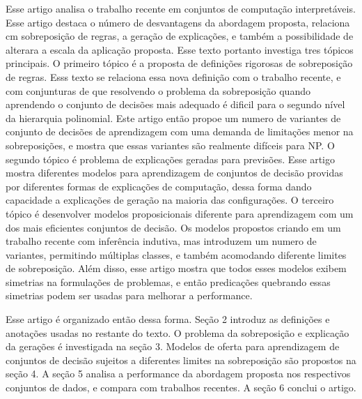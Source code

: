 \documentclass[a4paper, 12 pt]{article}
\begin{document}
	Esse artigo analisa o trabalho recente em conjuntos de computação interpretáveis. Esse artigo destaca o número de desvantagens da abordagem proposta, relaciona cm sobreposição de regras, a geração de explicações, e também a possibilidade de alterara a escala da aplicação proposta. Esse texto portanto investiga tres tópicos principais. O primeiro tópico é a proposta de definições rigorosas de sobreposição de regras. Esss texto se relaciona essa nova definição com o trabalho recente, e com conjunturas de que resolvendo o problema da sobreposição quando aprendendo o conjunto de decisões mais adequado é dificil para o segundo nível da hierarquia polinomial. Este artigo então propoe um numero de variantes de conjunto de decisões de aprendizagem com uma demanda de limitações menor na sobreposições, e mostra que essas variantes são realmente difíceis para NP. O segundo tópico é problema de explicações geradas para previsões. Esse artigo mostra diferentes modelos para aprendizagem de conjuntos de decisão providas por diferentes formas de explicações de computação, dessa forma dando capacidade a explicações de geração na maioria das configurações. O terceiro tópico é desenvolver modelos proposicionais diferente para aprendizagem com um dos mais eficientes conjuntos de decisão. Os modelos propostos criando em um trabalho recente com inferência indutiva, mas introduzem um numero de variantes, permitindo múltiplas classes, e também acomodando diferente limites de sobreposição. Além disso, esse artigo mostra que todos esses modelos exibem simetrias na formulações de problemas, e então predicações quebrando essas simetrias podem ser usadas para melhorar a performance.
	
	Esse artigo é organizado então dessa forma. Seção 2 introduz as definições e anotações usadas no restante do texto. O problema da sobreposição e explicação da gerações é investigada na seção 3. Modelos de oferta para aprendizagem de conjuntos de decisão sujeitos a diferentes limites na sobreposição são propostos na seção 4. A seção 5 analisa a performance da abordagem proposta nos respectivos conjuntos de dados, e compara com trabalhos recentes. A seção 6 conclui o artigo.
\end{document}
